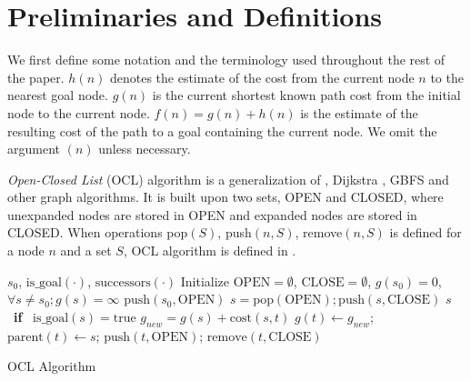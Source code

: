 \section{Preliminaries and Definitions}

\label{sec:preliminaries}

We first define some notation and the terminology used throughout the
rest of the paper.
$h(n)$ denotes the estimate of the cost from the current node $n$ to the nearest goal node.
$g(n)$ is the current shortest known path cost from the initial node to the current node.
$f(n)=g(n)+h(n)$ is the estimate of the resulting cost of the path to a goal
containing the current node.
We omit the argument $(n)$ unless necessary.

\emph{Open-Closed List} (OCL) algorithm \cite{Valenzano2016} is a generalization of \astar, Dijkstra \cite{dijkstra1959note}, GBFS and other graph algorithms.
It is built upon two sets, OPEN and CLOSED, where unexpanded nodes are stored in OPEN and expanded nodes are stored in CLOSED. When operations pop$(S)$, push$(n,S)$, remove$(n,S)$ is defined for a node $n$ and a set $S$, OCL algorithm is defined in .

\begin{algorithm}                      
\begin{algorithmic}
 \REQUIRE $s_0$, $\text{is\_goal}(\cdot)$, $\text{successors}(\cdot)$ %
 \STATE Initialize $\text{OPEN}=\emptyset$, $\text{CLOSE}=\emptyset$, $g(s_0)=0$, $\forall s\not=s_0; g(s)=\infty$
 \STATE $\text{push}(s_0,\text{OPEN})$
 \STATE $s = \text{pop}(\text{OPEN}); \text{push}(s,\text{CLOSE})$
 \RETURN $s$ \  \textbf{if} \  $\text{is\_goal}(s)=\text{true}$
 \STATE $g_{new} = g(s) + \text{cost}(s,t)$
 \STATE $g(t) \leftarrow g_{new}$;\; $\text{parent}(t) \leftarrow s$;\; $\text{push}(t,\text{OPEN})$;\; $\text{remove}(t,\text{CLOSE})$
 \ENDIF
 \ENDFOR
 \ENDWHILE
\end{algorithmic}
\caption{OCL Algorithm}
\label{alg:ocl}
\end{algorithm}

